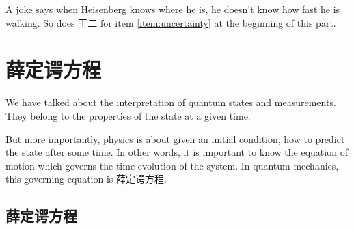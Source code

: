 A joke says when Heisenberg knows where he is, he doesn't know how fast he is walking. So does 王二 for item \ref{item:uncertainty} at the beginning of this part.


\section{薛定谔方程} \label{sec:schro-all}
We have talked about the interpretation of quantum states and measurements. They belong to the properties of the state at a given time.

But more importantly, physics is about given an initial condition, how to predict the state after some time. In other words, it is important to know the equation of motion which governs the time evolution of the system. In quantum mechanics, this governing equation is 薛定谔方程.

\needspace{0.2\textheight}
\subsection{薛定谔方程} \label{sec:Schrod}


